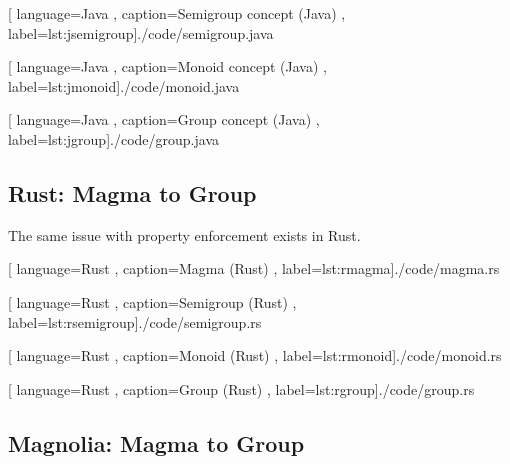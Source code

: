 \begin{center}
  
    [ language=Java
    , caption={Semigroup concept (Java)}
    , label=lst:jsemigroup]{./code/semigroup.java}
\end{center}

\begin{center}
  
    [ language=Java
    , caption={Monoid concept (Java)}
    , label=lst:jmonoid]{./code/monoid.java}
\end{center}

\begin{center}
  
    [ language=Java
    , caption={Group concept (Java)}
    , label=lst:jgroup]{./code/group.java}
\end{center}

\subsection{Rust: Magma to Group}

The same issue with property enforcement exists in Rust.

\begin{center}
  
    [ language=Rust
    , caption={Magma (Rust)}
    , label=lst:rmagma]{./code/magma.rs}
\end{center}

\begin{center}
  
    [ language=Rust
    , caption={Semigroup (Rust)}
    , label=lst:rsemigroup]{./code/semigroup.rs}
\end{center}

\begin{center}
  
    [ language=Rust
    , caption={Monoid (Rust)}
    , label=lst:rmonoid]{./code/monoid.rs}
\end{center}

\begin{center}
  
    [ language=Rust
    , caption={Group (Rust)}
    , label=lst:rgroup]{./code/group.rs}
\end{center}

\subsection{Magnolia: Magma to Group}

